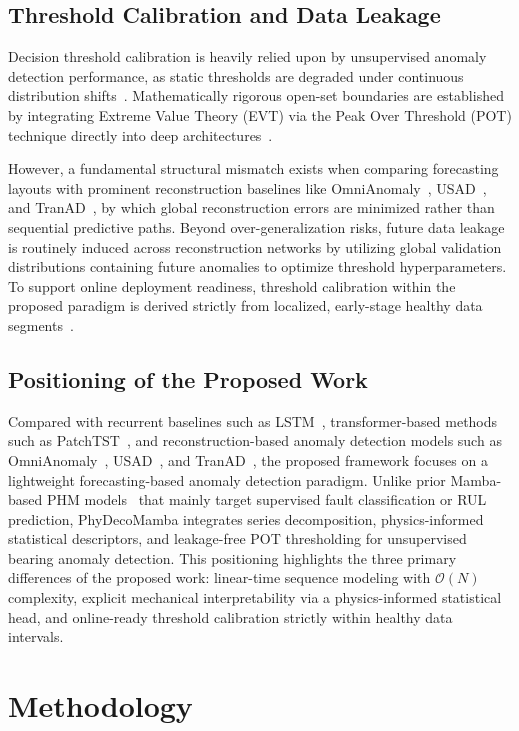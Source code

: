 \documentclass[runningheads]{llncs}
\begin{document}
\subsection{Threshold Calibration and Data Leakage} \label{sect:s2dot3}
Decision threshold calibration is heavily relied upon by unsupervised anomaly detection performance, as static thresholds are degraded under continuous distribution shifts~\cite{ref-9}. Mathematically rigorous open-set boundaries are established by integrating Extreme Value Theory (EVT) via the Peak Over Threshold (POT) technique directly into deep architectures~\cite{ref-10}. 

However, a fundamental structural mismatch exists when comparing forecasting layouts with prominent reconstruction baselines like OmniAnomaly~\cite{ref-18}, USAD~\cite{ref-19}, and TranAD~\cite{ref-20}, by which global reconstruction errors are minimized rather than sequential predictive paths. Beyond over-generalization risks, future data leakage is routinely induced across reconstruction networks by utilizing global validation distributions containing future anomalies to optimize threshold hyperparameters. To support online deployment readiness, threshold calibration within the proposed paradigm is derived strictly from localized, early-stage healthy data segments~\cite{ref-9}.

\subsection{Positioning of the Proposed Work} \label{sect:s2dot4}
Compared with recurrent baselines such as LSTM~\cite{ref-1}, transformer-based methods such as PatchTST~\cite{ref-4}, and reconstruction-based anomaly detection models such as OmniAnomaly~\cite{ref-18}, USAD~\cite{ref-19}, and TranAD~\cite{ref-20}, the proposed framework focuses on a lightweight forecasting-based anomaly detection paradigm. Unlike prior Mamba-based PHM models~\cite{ref-6,ref-7} that mainly target supervised fault classification or RUL prediction, PhyDecoMamba integrates series decomposition, physics-informed statistical descriptors, and leakage-free POT thresholding for unsupervised bearing anomaly detection. This positioning highlights the three primary differences of the proposed work: linear-time sequence modeling with $\mathcal{O}(N)$ complexity, explicit mechanical interpretability via a physics-informed statistical head, and online-ready threshold calibration strictly within healthy data intervals.

\section{Methodology} \label{sect:s3}
\end{document}

